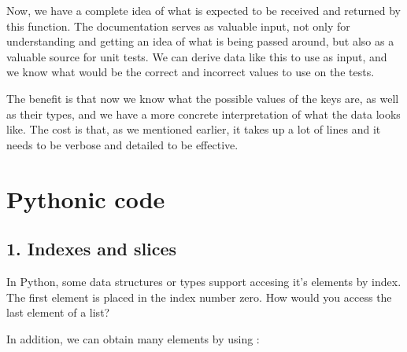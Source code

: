 \documentclass[a4paper,10pt,english]{sphinxmanual}
\begin{document}
Now, we have a complete idea of what is expected to be received and returned by this function.
The documentation serves as valuable input, not only for understanding and getting an idea of what is being
passed around, but also as a valuable source for unit tests. We can derive data like this to use as input, and
we know what would be the correct and incorrect values to use on the tests.

The benefit is that now we know what the possible values of the keys are, as well as their types, and we have
a more concrete interpretation of what the data looks like. The cost is that, as we mentioned earlier, it
takes up a lot of lines and it needs to be verbose and detailed to be effective.


\chapter{Pythonic code}
\label{\detokenize{chapters/2_pythonic_code/index:pythonic-code}}\label{\detokenize{chapters/2_pythonic_code/index::doc}}

\section{1. Indexes and slices}
\label{\detokenize{chapters/2_pythonic_code/index:indexes-and-slices}}
In Python, some data structures or types support accesing it’s elements by index. The first element is placed in the
index number zero. How would you access the last element of a list?

\begin{sphinxVerbatim}[commandchars=\\\{\}]
      
\PYG{p}{[}\PYG{p}{]}
\PYG{p}{[}\PYG{p}{]}
\end{sphinxVerbatim}

In addition, we can obtain many elements by using :

\begin{sphinxVerbatim}[commandchars=\\\{\}]
\PYG{p}{[}\PYG{p}{]}
\end{sphinxVerbatim}
\end{document}
